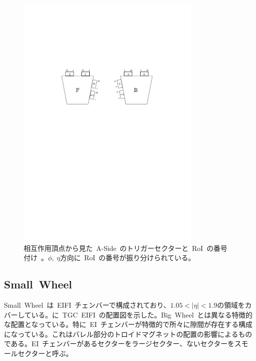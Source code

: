 \begin{figure}[tbp]
        \centering   
        \includegraphics[width=0.8\textwidth,page=8]{img/pdf/TGC.pdf}
        \caption[トリガーセクターと~RoI~の番号付け]{相互作用頂点から見た~A-Side~のトリガーセクターと~RoI~の番号付け~\cite{TR:02}。$\phi,~\eta$方向に~RoI~の番号が振り分けられている。}
        \label{fig:tgcsector}
\end{figure}

\subsection{Small~Wheel}
Small~Wheel~は~EIFI~チェンバーで構成されており、$1.05<|\eta|<1.9$の領域をカバーしている。に~TGC~EIFI~の配置図を示した。Big~Wheel~とは異なる特徴的な配置となっている。特に~EI~チェンバーが特徴的で所々に隙間が存在する構成になっている。これはバレル部分のトロイドマグネットの配置の影響によるものである。EI~チェンバーがあるセクターをラージセクター、ないセクターをスモールセクターと呼ぶ。

